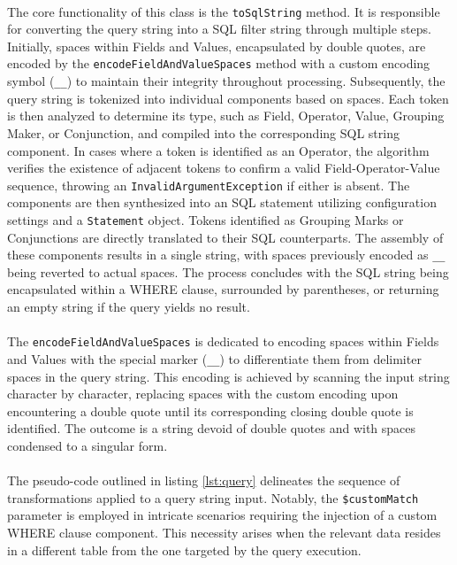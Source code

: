 \paragraph{} The core functionality of this class is the \verb|toSqlString| method. It is responsible for converting the query string into a SQL filter string through multiple steps. Initially, spaces within Fields and Values, encapsulated by double quotes, are encoded by the \verb|encodeFieldAndValueSpaces| method with a custom encoding symbol (\verb|__|) to maintain their integrity throughout processing. Subsequently, the query string is tokenized into individual components based on spaces. Each token is then analyzed to determine its type, such as Field, Operator, Value, Grouping Maker, or Conjunction, and compiled into the corresponding SQL string component. In cases where a token is identified as an Operator, the algorithm verifies the existence of adjacent tokens to confirm a valid Field-Operator-Value sequence, throwing an \verb|InvalidArgumentException| if either is absent. The components are then synthesized into an SQL statement utilizing configuration settings and a \verb|Statement| object. Tokens identified as Grouping Marks or Conjunctions are directly translated to their SQL counterparts. The assembly of these components results in a single string, with spaces previously encoded as \verb|__| being reverted to actual spaces. The process concludes with the SQL string being encapsulated within a WHERE clause, surrounded by parentheses, or returning an empty string if the query yields no result.

\paragraph{} The \verb|encodeFieldAndValueSpaces| is dedicated to encoding spaces within Fields and Values with the special marker (\verb|__|) to differentiate them from delimiter spaces in the query string. This encoding is achieved by scanning the input string character by character, replacing spaces with the custom encoding upon encountering a double quote until its corresponding closing double quote is identified. The outcome is a string devoid of double quotes and with spaces condensed to a singular form.

\paragraph{} The pseudo-code outlined in listing \ref{lst:query} delineates the sequence of transformations applied to a query string input. Notably, the \verb|$customMatch| parameter is employed in intricate scenarios requiring the injection of a custom WHERE clause component. This necessity arises when the relevant data resides in a different table from the one targeted by the query execution. 

